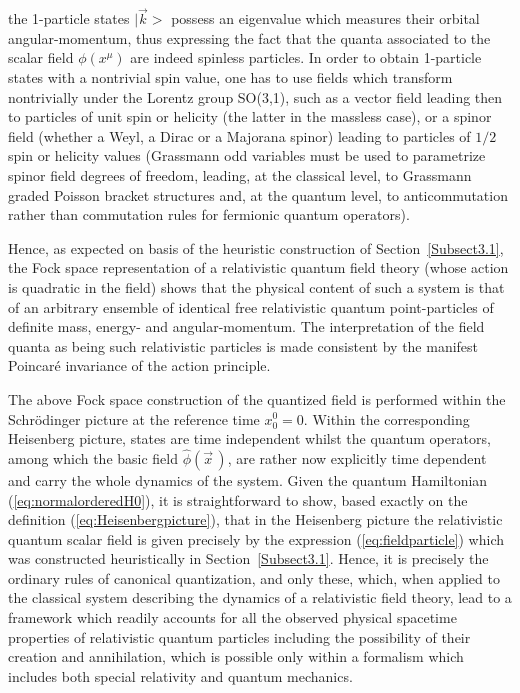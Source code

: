 \documentclass[a4paper,11pt]{article}
\begin{document}
the 1-particle states $|\vec{k}>$ possess an eigenvalue which measures
their orbital angular-momentum, thus expressing the fact that the
quanta associated to the scalar field $\phi(x^\mu)$ are indeed
spinless particles. In order to obtain 1-particle states with a
nontrivial spin value, one has to use fields which transform
nontrivially under the Lorentz group SO(3,1), such as a vector field
lea\-ding then to particles of unit spin or helicity (the latter in the
massless case), or a spinor field (whether a Weyl, a Dirac or a Majorana
spinor) leading to particles of $1/2$ spin or helicity values (Grassmann odd 
variables must be used to parametrize spinor field degrees of freedom, 
leading, at the classical level, to Grassmann graded Poisson bracket
structures and, at the quantum level, to anticommutation rather than
commutation rules for fermionic quantum operators).

Hence, as expected on basis of the heuristic construction of 
Section~\ref{Subsect3.1}, the Fock space representation of a
relativistic quantum field theory (whose action is quadratic
in the field) shows that the physical content of such a system
is that of an arbitrary ensemble of identical free relativistic quantum 
point-particles of definite mass, energy- and angular-momentum. 
The interpretation
of the field quanta as being such relativistic particles is made consistent 
by the manifest Poincar\'e invariance of the action principle. 

The above Fock space construction of the quantized field is performed
within the Schr\"odinger picture at the reference time $x^0_0=0$. Within the
cor\-res\-pon\-ding Heisenberg picture, states are time independent
whilst the quantum operators, among which the basic field
$\hat{\phi}(\vec{x}\,)$, are rather now explicitly time dependent and
carry the whole dynamics of the system. Given the quantum Hamiltonian
(\ref{eq:normalorderedH0}), it is straightforward to show, based exactly
on the definition (\ref{eq:Heisenbergpicture}), that in the Heisenberg
picture the relativistic quantum scalar field is given precisely
by the expression (\ref{eq:fieldparticle}) which was constructed
heuristically in Section~\ref{Subsect3.1}. Hence, it is precisely the ordinary
rules of canonical quantization, and only these, which, when applied to the
classical system describing the dynamics of a relativistic field theory,
lead to a framework which rea\-dily accounts for all the observed physical
spacetime properties of relativistic quantum particles including the
possibility of their creation and annihilation, which is possible
only within a formalism which includes both special relativity and
quantum mechanics.
\end{document}
